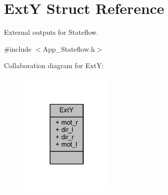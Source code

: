 \hypertarget{struct_ext_y}{}\section{ExtY Struct Reference}
\label{struct_ext_y}


External outputs for Stateflow.  




{\ttfamily \#include $<$App\+\_\+\+Stateflow.\+h$>$}



Collaboration diagram for ExtY\+:
\nopagebreak
\begin{figure}[H]
\begin{center}
\leavevmode
\includegraphics[width=130pt]{struct_ext_y__coll__graph}
\end{center}
\end{figure}
